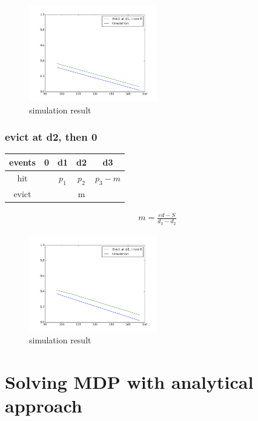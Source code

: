 \documentclass[12pt, letterpaper]{article}
\begin{document}
\begin{figure}[H]
\centering
\includegraphics[width=0.5\textwidth]{sim_d1_3.png}
\caption{simulation result}
\end{figure}

\subsubsection{evict at d2, then 0}

\begin{center}
\begin{tabular}{c | c c c c}
\hline
events & 0 & d1 & d2 & d3 \\
\hline
hit & & $p_1$& $p_2$ & $p_3-m$ \\
evict & &  & m & 
\end{tabular}
\end{center}

\begin{equation}
\begin{aligned}
m  = \frac{ed - S}{d_3 - d_2}
\end{aligned}
\end{equation}

\begin{figure}[H]
\centering
\includegraphics[width=0.5\textwidth]{sim_d2_3.png}
\caption{simulation result}
\end{figure}

\section{Solving MDP with analytical approach}
\end{document}

